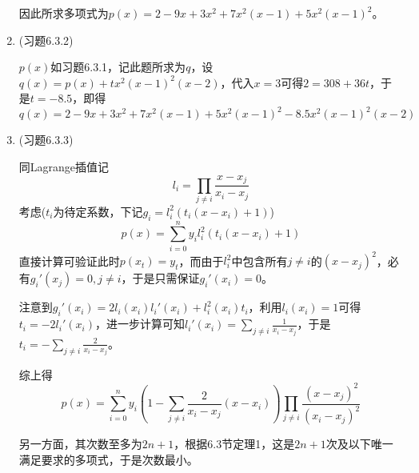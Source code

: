 \documentclass[a4paper,UTF8,fontset=windows]{ctexart}
\begin{document}
\begin{enumerate}
    因此所求多项式为$p(x)=2-9x+3x^2+7x^2(x-1)+5x^2(x-1)^2$。
    
    \item (习题6.3.2)
    
    $p(x)$如习题6.3.1，记此题所求为$q$，设$q(x)=p(x)+tx^2(x-1)^2(x-2)$，代入$x=3$可得$2=308+36t$，于是$t=-8.5$，即得
    $$q(x)=2-9x+3x^2+7x^2(x-1)+5x^2(x-1)^2-8.5x^2(x-1)^2(x-2)$$
    
    \item (习题6.3.3)
    
    同Lagrange插值记
    $$l_i=\prod_{j\ne i}\frac{x-x_j}{x_i-x_j}$$
    考虑($t_i$为待定系数，下记$g_i=l_i^2(t_i(x-x_i)+1)$)
    $$p(x)=\sum_{i=0}^ny_il_i^2(t_i(x-x_i)+1)$$
    直接计算可验证此时$p(x_t)=y_t$，而由于$l_i^2$中包含所有$j\ne i$的$(x-x_j)^2$，必有$g_i'(x_j)=0,j\ne i$，于是只需保证$g_i'(x_i)=0$。
    
    注意到$g_i'(x_i)=2l_i(x_i)l_i'(x_i)+l_i^2(x_i)t_i$，利用$l_i(x_i)=1$可得$t_i=-2l_i'(x_i)$，进一步计算可知$l_i'(x_i)=\sum_{j\ne i}\frac{1}{x_i-x_j}$，于是$t_i=-\sum_{j\ne i}\frac{2}{x_i-x_j}$。
    
    综上得
    $$p(x)=\sum_{i=0}^ny_i\left(1-\sum_{j\ne i}\frac{2}{x_i-x_j}(x-x_i)\right)\prod_{j\ne i}\frac{(x-x_j)^2}{(x_i-x_j)^2}$$
    
    另一方面，其次数至多为$2n+1$，根据6.3节定理1，这是$2n+1$次及以下唯一满足要求的多项式，于是次数最小。
\end{enumerate}
\end{document}
